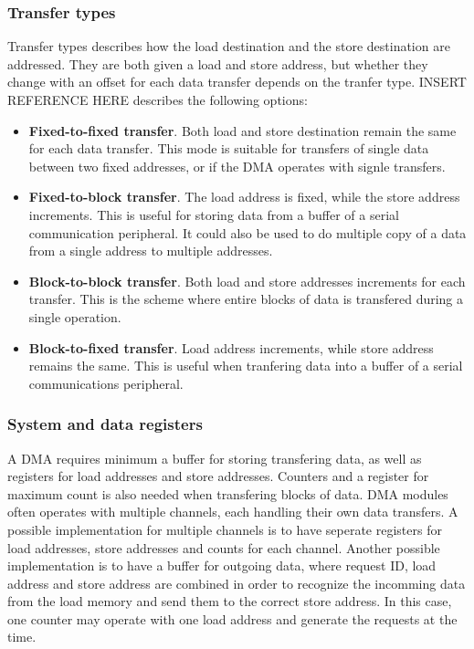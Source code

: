 \subsubsection{Transfer types}
Transfer types describes how the load destination and the store destination are addressed.
They are both given a load and store address, but whether they change with an offset for each data transfer depends on the tranfer type.
INSERT REFERENCE HERE describes the following options:
\begin{itemize}
    \item \textbf{Fixed-to-fixed transfer}.
    Both load and store destination remain the same for each data transfer.
    This mode is suitable for transfers of single data between two fixed addresses, or if the DMA operates with signle transfers.
    \item \textbf{Fixed-to-block transfer}.
    The load address is fixed, while the store address increments.
    This is useful for storing data from a buffer of a serial communication peripheral.
    It could also be used to do multiple copy of a data from a single address to multiple addresses.
    \item \textbf{Block-to-block transfer}.
    Both load and store addresses increments for each transfer.
    This is the scheme where entire blocks of data is transfered during a single operation.
     \item \textbf{Block-to-fixed transfer}.
    Load address increments, while store address remains the same.
    This is useful when tranfering data into a buffer of a serial communications peripheral.
\end{itemize}

\subsubsection{System and data registers}
A DMA requires minimum a buffer for storing transfering data, as well as registers for load addresses and store addresses.
Counters and a register for maximum count is also needed when transfering blocks of data.
DMA modules often operates with multiple channels, each handling their own data transfers.
A possible implementation for multiple channels is to have seperate registers for load addresses, store addresses and counts for each channel.
Another possible implementation is to have a buffer for outgoing data, where request ID, load address and store address are combined in order to recognize the incomming data from the load memory and send them to the correct store address.
In this case, one counter may operate with one load address and generate the requests at the time.


